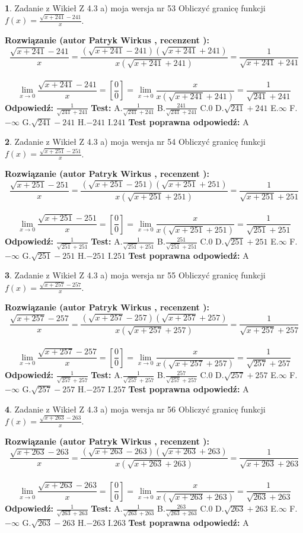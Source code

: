 \documentclass[12pt, a4paper]{article}
\theoremstyle{definition} %
\newtheorem{zad}{}
\newcommand{\zadStart}[1]{\begin{zad}#1\newline}
\newcommand{\zadStop}{\end{zad}}
\newcommand{\rozwStart}[2]{\noindent \textbf{Rozwiązanie (autor #1 , recenzent #2): }\newline}
\newcommand{\rozwStop}{\newline}
\newcommand{\odpStart}{\noindent \textbf{Odpowiedź:}\newline}
\newcommand{\odpStop}{\newline}
\newcommand{\testStart}{\noindent \textbf{Test:}\newline}
\newcommand{\testStop}{\newline}
\newcommand{\kluczStart}{\noindent \textbf{Test poprawna odpowiedź:}\newline}
\newcommand{\kluczStop}{\newline}
\begin{document}
\zadStart{Zadanie z Wikieł Z 4.3 a) moja wersja nr 53}
Obliczyć granicę funkcji $f(x)=\frac{\sqrt{x+241}-241}{x}$.
\zadStop
\rozwStart{Patryk Wirkus}{}
$$\frac{\sqrt{x+241}-241}{x}=\frac{(\sqrt{x+241}-241)(\sqrt{x+241}+241)}{x(\sqrt{x+241}+241)}=\frac{1}{\sqrt{x+241}+241}$$
\\
$$\lim\limits_{x\to0}\frac{\sqrt{x+241}-241}{x}=[\frac{0}{0}]=
\lim\limits_{x\to0}\frac{x}{x(\sqrt{x+241}+241)} = \frac{1}{\sqrt{241}+241}$$
\rozwStop
\odpStart
$\frac{1}{\sqrt{241}+241}$
\odpStop
\testStart
A.$\frac{1}{\sqrt{241}+241}$
B.$\frac{241}{\sqrt{241}+241}$
C.$0$
D.$\sqrt{241}+241$
E.$\infty$
F.$-\infty$
G.$\sqrt{241}-241$
H.$-241$
I.$241$
\testStop
\kluczStart
A
\kluczStop



\zadStart{Zadanie z Wikieł Z 4.3 a) moja wersja nr 54}
Obliczyć granicę funkcji $f(x)=\frac{\sqrt{x+251}-251}{x}$.
\zadStop
\rozwStart{Patryk Wirkus}{}
$$\frac{\sqrt{x+251}-251}{x}=\frac{(\sqrt{x+251}-251)(\sqrt{x+251}+251)}{x(\sqrt{x+251}+251)}=\frac{1}{\sqrt{x+251}+251}$$
\\
$$\lim\limits_{x\to0}\frac{\sqrt{x+251}-251}{x}=[\frac{0}{0}]=
\lim\limits_{x\to0}\frac{x}{x(\sqrt{x+251}+251)} = \frac{1}{\sqrt{251}+251}$$
\rozwStop
\odpStart
$\frac{1}{\sqrt{251}+251}$
\odpStop
\testStart
A.$\frac{1}{\sqrt{251}+251}$
B.$\frac{251}{\sqrt{251}+251}$
C.$0$
D.$\sqrt{251}+251$
E.$\infty$
F.$-\infty$
G.$\sqrt{251}-251$
H.$-251$
I.$251$
\testStop
\kluczStart
A
\kluczStop



\zadStart{Zadanie z Wikieł Z 4.3 a) moja wersja nr 55}
Obliczyć granicę funkcji $f(x)=\frac{\sqrt{x+257}-257}{x}$.
\zadStop
\rozwStart{Patryk Wirkus}{}
$$\frac{\sqrt{x+257}-257}{x}=\frac{(\sqrt{x+257}-257)(\sqrt{x+257}+257)}{x(\sqrt{x+257}+257)}=\frac{1}{\sqrt{x+257}+257}$$
\\
$$\lim\limits_{x\to0}\frac{\sqrt{x+257}-257}{x}=[\frac{0}{0}]=
\lim\limits_{x\to0}\frac{x}{x(\sqrt{x+257}+257)} = \frac{1}{\sqrt{257}+257}$$
\rozwStop
\odpStart
$\frac{1}{\sqrt{257}+257}$
\odpStop
\testStart
A.$\frac{1}{\sqrt{257}+257}$
B.$\frac{257}{\sqrt{257}+257}$
C.$0$
D.$\sqrt{257}+257$
E.$\infty$
F.$-\infty$
G.$\sqrt{257}-257$
H.$-257$
I.$257$
\testStop
\kluczStart
A
\kluczStop



\zadStart{Zadanie z Wikieł Z 4.3 a) moja wersja nr 56}
Obliczyć granicę funkcji $f(x)=\frac{\sqrt{x+263}-263}{x}$.
\zadStop
\rozwStart{Patryk Wirkus}{}
$$\frac{\sqrt{x+263}-263}{x}=\frac{(\sqrt{x+263}-263)(\sqrt{x+263}+263)}{x(\sqrt{x+263}+263)}=\frac{1}{\sqrt{x+263}+263}$$
\\
$$\lim\limits_{x\to0}\frac{\sqrt{x+263}-263}{x}=[\frac{0}{0}]=
\lim\limits_{x\to0}\frac{x}{x(\sqrt{x+263}+263)} = \frac{1}{\sqrt{263}+263}$$
\rozwStop
\odpStart
$\frac{1}{\sqrt{263}+263}$
\odpStop
\testStart
A.$\frac{1}{\sqrt{263}+263}$
B.$\frac{263}{\sqrt{263}+263}$
C.$0$
D.$\sqrt{263}+263$
E.$\infty$
F.$-\infty$
G.$\sqrt{263}-263$
H.$-263$
I.$263$
\testStop
\kluczStart
A
\kluczStop
\end{document}
